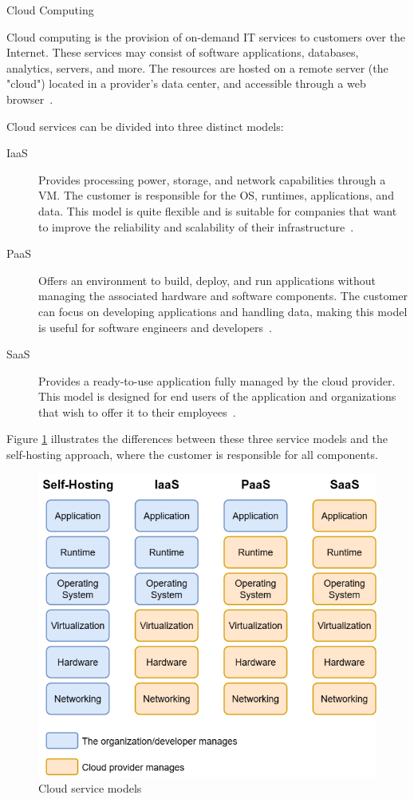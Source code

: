 \documentclass[12pt, reqno]{amsbook}
\makeatletter
\def\section{\@startsection{section}{1}%
      \z@{.5\linespacing\@plus.7\linespacing}{.25\linespacing}%
      {\normalfont\bfseries\flushleft}}
\theoremstyle{definition}
\theoremstyle{definition}
\numberwithin{section}{chapter}
\numberwithin{table}{chapter}
\numberwithin{figure}{chapter}
\makeatother
\begin{document}
\section{Cloud Computing}
\label{Section:Cloud_Computing}

Cloud computing is the provision of on-demand \ac{IT} services to customers over the Internet. These services may consist of software applications, databases, analytics, servers, and more. The resources are hosted on a remote server (the "cloud") located in a provider's data center, and accessible through a web browser~\cite{Figueira2024,  Nordic2012, Nadeem2024, Villamizar2016}.

Cloud services can be divided into three distinct models:
\begin{description}
  \item [\ac{IaaS}] Provides processing power, storage, and network capabilities through a \ac{VM}. The customer is responsible for the \ac{OS}, runtimes, applications, and data. This model is quite flexible and is suitable for companies that want to improve the reliability and scalability of their infrastructure~\cite{Figueira2024, Nordic2012, Google, Berry2021}.
  \item [\ac{PaaS}] Offers an environment to build, deploy, and run applications without managing the associated hardware and software components. The customer can focus on developing applications and handling data, making this model is useful for software engineers and developers~\cite{Figueira2024, Nordic2012, Google, Berry2021}.
  \item [\ac{SaaS}] Provides a ready-to-use application fully managed by the cloud provider. This model is designed for end users of the application and organizations that wish to offer it to their employees~\cite{Figueira2024, Nordic2012, Google, Berry2021}.
\end{description}

Figure \ref{Figure:CloudServiceModels} illustrates the differences between these three service models and the self-hosting approach, where the customer is responsible for all components.

\FloatBarrier
\begin{figure}[H]
  \includegraphics[width=0.7\linewidth]{images/CloudServiceModels.png}
  \caption{\label{Figure:CloudServiceModels}Cloud service models}
\end{figure}
\FloatBarrier
\end{document}
